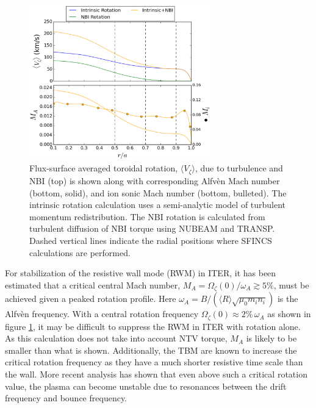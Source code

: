 \documentclass[aip, pop, preprint]{revtex4-1}
\begin{document}
\FloatBarrier

\begin{figure}[h!]
\centering
\includegraphics[width=0.7\textwidth]{figure4.eps}
\caption{\label{fig:rotation_estimate} Flux-surface averaged toroidal rotation, $\langle V_{\zeta} \rangle$, due to turbulence and NBI (top) is shown along with  corresponding Alfv\`{e}n Mach number (bottom, solid), and ion sonic Mach number (bottom, bulleted). The intrinsic rotation calculation uses a semi-analytic model of turbulent momentum redistribution.\cite{Hillesheim2015} The NBI rotation is calculated from turbulent diffusion of NBI torque using NUBEAM and TRANSP.\cite{Poli2014} Dashed vertical lines indicate the radial positions where SFINCS calculations are performed. }
\end{figure}

For stabilization of the resistive wall mode (RWM) in ITER, it has been estimated \cite{Liu2004} that a critical central Mach number, $M_A = \Omega_{\zeta}(0)/\omega_A \gtrsim 5\%$, must be achieved given a peaked rotation profile. Here $\omega_A = B/(\langle R\rangle\sqrt{\mu_0 m_i n_i})$ is the Alfv\`{e}n frequency. With a central rotation frequency $\Omega_{\zeta}(0) \approx 2\% \, \omega_A$ as shown in figure \ref{fig:rotation_estimate}, it may be difficult to suppress the RWM in ITER with rotation alone. As this calculation does not take into account NTV torque, $M_A$ is likely to be smaller than what is shown. Additionally, the TBM are known to increase the critical rotation frequency as they have a much shorter resistive time scale than the wall.\cite{Liu2004} More recent analysis has shown that even above such a critical rotation value, the plasma can become unstable due to resonances between the drift frequency and bounce frequency.\cite{Berkery2010, Liu2009}
\end{document}
